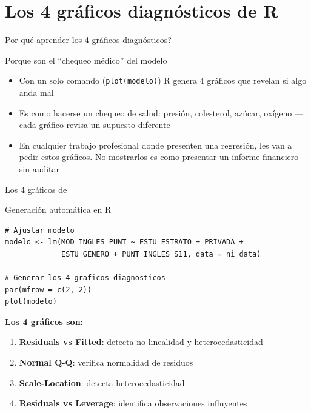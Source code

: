 \documentclass[aspectratio=169, 11pt]{beamer}
\begin{document}
\section{Los 4 gráficos diagnósticos de R}

\begin{frame}{\textquestiondown{}Por qu\'e aprender los 4 gr\'aficos diagn\'osticos?}
\begin{exampleblock}{Porque son el ``chequeo m\'edico'' del modelo}
\small
\begin{itemize}\setlength{\itemsep}{2pt}
  \item Con un solo comando (\texttt{plot(modelo)}) R genera 4 gr\'aficos que revelan si algo anda mal
  \item Es como hacerse un chequeo de salud: presi\'on, colesterol, az\'ucar, ox\'igeno --- cada gr\'afico revisa un supuesto diferente
  \item En cualquier trabajo profesional donde presenten una regresi\'on, les van a pedir estos gr\'aficos. No mostrarlos es como presentar un informe financiero sin auditar
\end{itemize}
\end{exampleblock}
\end{frame}

\begin{frame}[fragile]{Los 4 gráficos de }
\begin{block}{Generación automática en R}
\begin{lstlisting}
# Ajustar modelo
modelo <- lm(MOD_INGLES_PUNT ~ ESTU_ESTRATO + PRIVADA +
             ESTU_GENERO + PUNT_INGLES_S11, data = ni_data)

# Generar los 4 graficos diagnosticos
par(mfrow = c(2, 2))
plot(modelo)
\end{lstlisting}
\end{block}

\textbf{Los 4 gráficos son:}
\begin{enumerate}
\item \textbf{Residuals vs Fitted}: detecta no linealidad y heterocedasticidad
\item \textbf{Normal Q-Q}: verifica normalidad de residuos
\item \textbf{Scale-Location}: detecta heterocedasticidad
\item \textbf{Residuals vs Leverage}: identifica observaciones influyentes
\end{enumerate}
\end{frame}
\end{document}
